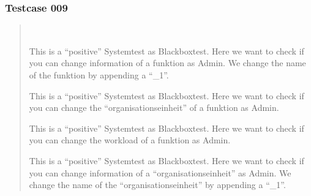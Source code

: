 \documentclass[letterpaper,10pt,english]{sphinxmanual}
\begin{document}
\subsubsection{Testcase 009}
\label{\detokenize{masterCodeDoc:testcase-009}}\begin{quote}


\begin{fulllineitems}
~

\begin{fulllineitems}
This is a “positive” Systemtest as Blackboxtest.
Here we want to check if you can change information of a funktion as Admin.
We change the name of the funktion by appending a “\_1”.

\end{fulllineitems}



\begin{fulllineitems}
This is a “positive” Systemtest as Blackboxtest.
Here we want to check if you can change the “organisationseinheit” of a funktion as Admin.

\end{fulllineitems}



\begin{fulllineitems}
This is a “positive” Systemtest as Blackboxtest.
Here we want to check if you can change the workload of a funktion as Admin.

\end{fulllineitems}



\begin{fulllineitems}
This is a “positive” Systemtest as Blackboxtest.
Here we want to check if you can change information of a “organisationseinheit” as Admin.
We change the name of the “organisationseinheit” by appending a “\_1”.

\end{fulllineitems}




\end{fulllineitems}
\end{quote}
\end{document}
